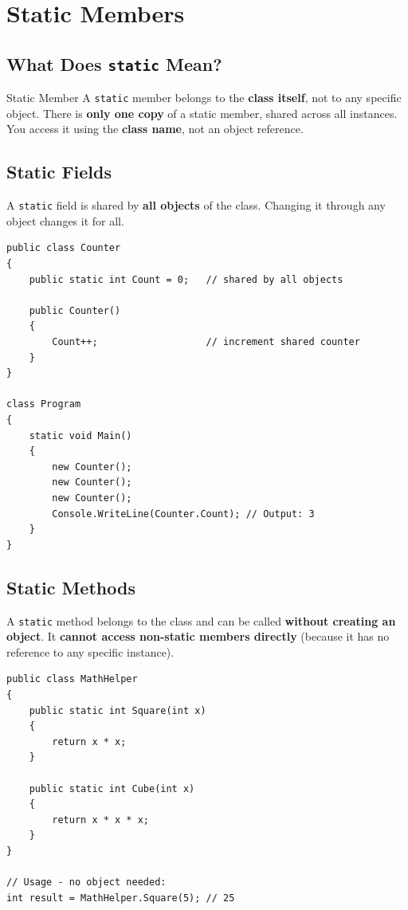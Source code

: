 \documentclass[11pt,a4paper]{article}
\begin{document}
\clearpage
\section{Static Members}

\subsection{What Does \texttt{static} Mean?}

\begin{defnBox}{Static Member}
A \texttt{static} member belongs to the \textbf{class itself}, not to any specific object. There is \textbf{only one copy} of a static member, shared across all instances. You access it using the \textbf{class name}, not an object reference.
\end{defnBox}

\subsection{Static Fields}

A \texttt{static} field is shared by \textbf{all objects} of the class. Changing it through any object changes it for all.

\begin{lstlisting}[caption={Static field shared across instances}]
public class Counter
{
    public static int Count = 0;   // shared by all objects

    public Counter()
    {
        Count++;                   // increment shared counter
    }
}

class Program
{
    static void Main()
    {
        new Counter();
        new Counter();
        new Counter();
        Console.WriteLine(Counter.Count); // Output: 3
    }
}
\end{lstlisting}

\subsection{Static Methods}

A \texttt{static} method belongs to the class and can be called \textbf{without creating an object}. It \textbf{cannot access non-static members directly} (because it has no reference to any specific instance).

\begin{lstlisting}[caption={Static method}]
public class MathHelper
{
    public static int Square(int x)
    {
        return x * x;
    }

    public static int Cube(int x)
    {
        return x * x * x;
    }
}

// Usage - no object needed:
int result = MathHelper.Square(5); // 25
\end{lstlisting}
\end{document}
